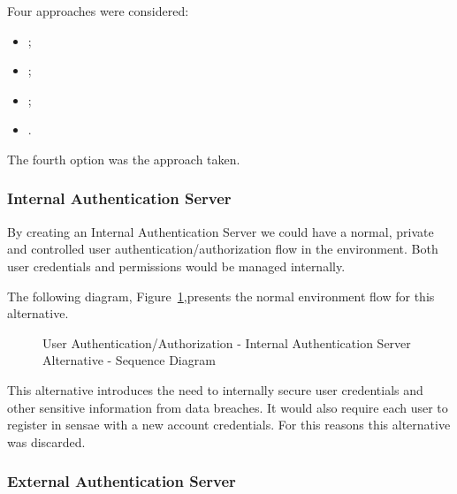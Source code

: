 Four approaches were considered:

\begin{itemize}
   \item {};
   \item {};
   \item {};
   \item {}.
\end{itemize}

The fourth option was the approach taken.

\subsubsection{Internal Authentication Server}
\label{subsubsec:design:alternatives:auth:internalauth}

By creating an Internal Authentication Server we could have a normal, private and controlled user authentication/authorization flow in the environment. Both user credentials and permissions would be managed internally.

The following diagram, Figure~\ref{fig:design:alternatives:auth:internalauth:diagram},presents the normal environment flow for this alternative.

\begin{figure}[H]
   \centering
   \resizebox{\columnwidth}{!}
   {
      
   }
   \caption[User Authentication/Authorization - Internal Authentication Server Alternative - Sequence Diagram]{User Authentication/Authorization - Internal Authentication Server Alternative - Sequence Diagram}
   \label{fig:design:alternatives:auth:internalauth:diagram}
\end{figure}

This alternative introduces the need to internally secure user credentials and other sensitive information from data breaches. It would also require each user to register in sensae with a new account credentials. For this reasons this alternative was discarded.

\subsubsection{External Authentication Server}
\label{subsubsec:design:alternatives:auth:externalauth}


